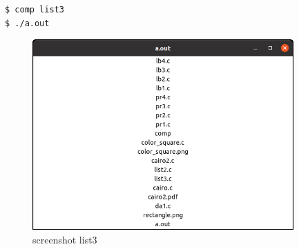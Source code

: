 \begin{lstlisting}
$ comp list3
$ ./a.out
\end{lstlisting}

\begin{figure}
\centering
\includegraphics[width=10cm,height=7.3cm]{../image/list3.png}
\caption{screenshot list3}
\end{figure}
